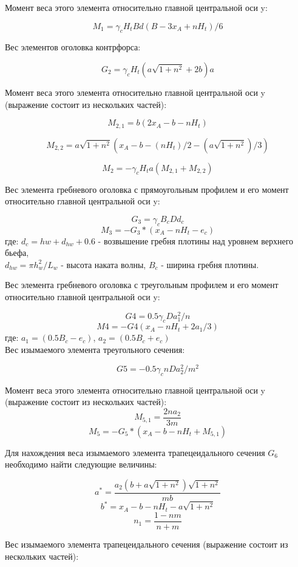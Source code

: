\documentclass[12pt,a4paper,oneside,draft,titlepage]{article}
\begin{document}
Момент веса этого элемента относительно главной центральной оси y:

$$ M_1 = \gamma_c  H_t  B  d  (B - 3  x_A + n  H_t) / 6 $$

Вес элементов оголовка контрфорса:

$$ G_2 = \gamma_c  H_t  (a  \sqrt{1 + n ^ 2} + 2  b)  a $$

Момент веса этого элемента относительно главной центральной оси y (выражение состоит из нескольких частей):

$$ M_{2,1} = b  (2  x_A - b - n  H_t) $$
 
$$ M_{2,2} = a  \sqrt{1 + n ^ 2}  (x_A - b - (n  H_t) / 2 - (a  \sqrt{1 + n ^ 2}) / 3) $$
 
$$ M_2 = -\gamma_c  H_t  a ( M_{2,1} + M_{2,2} ) $$


Вес элемента гребневого оголовка с прямоугольным профилем и его момент относительно главной центральной оси y:

$$ G_3 = \gamma_c  B_c  D  d_c $$
$$ M_3 = -G_3 * (x_A - n  H_t - e_c) $$
где: $ d_c = hw + d_{hw} + 0.6 $ - возвышение гребня плотины над уровнем верхнего бьефа,\\
$ d_{hw} = \pi  h_w ^ 2 / L_w $ - высота наката волны,
$B_c$ - ширина гребня плотины.

Вес элемента гребневого оголовка с треугольным профилем и его момент относительно главной центральной оси y: 

$$ G4 = 0.5  \gamma_c  D  a_1 ^ 2 / n $$
$$ M4 = -G4  (x_A - n  H_t + 2  a_1 / 3) $$
где: $ a_1 = (0.5  B_c - e_c) $, $ a_2 = (0.5  B_c + e_c) $\\

Вес изымаемого элемента треугольного сечения:

$$ G5 = -0.5  \gamma_c  n  D  a_2 ^ 2 / m ^ 2 $$

Момент веса этого элемента относительно главной центральной оси y (выражение состоит из нескольких частей):
$$ M_{5,1} = \frac{2  n  a_2 }{ 3  m} $$
$$ M_5 = -G_5 * (x_A - b - n  H_t + M_{5,1}) $$

Для нахождения веса изымаемого элемента трапецеидального сечения $G_6$ необходимо найти следующие величины:

$$ a^* = \frac{a_2  (b + a  \sqrt{1 + n ^ 2})  \sqrt{1 + n ^ 2}} {m  b} $$
$$ b^* = x_A - b - n  H_t - a  \sqrt{1 + n ^ 2} $$
$$ n_1 = \frac {1 - n  m}{n + m} $$

Вес изымаемого элемента трапецеидального сечения (выражение состоит из нескольких частей):
\end{document}
